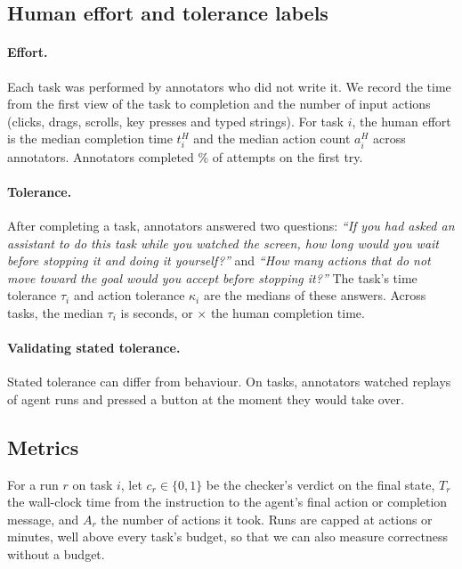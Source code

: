 \subsection{Human effort and tolerance labels}
\label{sec:labels}

\paragraph{Effort.} Each task was performed by  annotators who did not write it. We record the time from the first view of the task to completion and the number of input actions (clicks, drags, scrolls, key presses and typed strings). For task $i$, the human effort is the median completion time $t^{H}_i$ and the median action count $a^{H}_i$ across annotators. Annotators completed \% of attempts on the first try.

\paragraph{Tolerance.} After completing a task, annotators answered two questions: \emph{``If you had asked an assistant to do this task while you watched the screen, how long would you wait before stopping it and doing it yourself?''} and \emph{``How many actions that do not move toward the goal would you accept before stopping it?''} The task's time tolerance $\tau_i$ and action tolerance $\kappa_i$ are the medians of these answers. Across tasks, the median $\tau_i$ is  seconds, or $\times$ the human completion time. 

\paragraph{Validating stated tolerance.} Stated tolerance can differ from behaviour. On  tasks,  annotators watched replays of agent runs and pressed a button at the moment they would take over. 

\subsection{Metrics}
\label{sec:metrics}

For a run $r$ on task $i$, let $c_r \in \{0,1\}$ be the checker's verdict on the final state, $T_r$ the wall-clock time from the instruction to the agent's final action or completion message, and $A_r$ the number of actions it took. Runs are capped at  actions or  minutes, well above every task's budget, so that we can also measure correctness without a budget.

